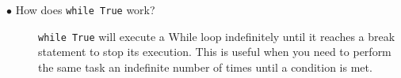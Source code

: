 \documentclass{article}
\newcommand{\inlinecode}[1]{\texttt{#1}}
\newcommand{\question}[1]{\item[$\bullet$ #1] \hfil}
\newenvironment{answer}{}{}
\newenvironment{faq}{\begin{description}}{\end{description}}
\begin{document}
\begin{faq}
				\question{How does \inlinecode{while True} work?}
				
				\begin{answer}
					\inlinecode{while True} will execute a While loop indefinitely until it reaches a break
					statement to stop its execution. This is useful when you need to perform the
					same task an indefinite number of times until a condition is met.
				\end{answer}
				
			\end{faq}
	
\end{document}
